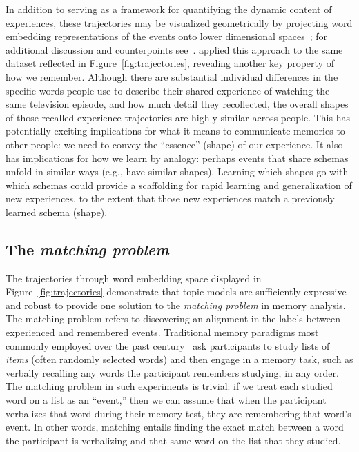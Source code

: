 \documentclass{article}
\begin{document}
In addition to serving as a framework for quantifying the dynamic content of experiences, these trajectories may be visualized geometrically by projecting word embedding representations of the events onto lower dimensional spaces~\citep[e.g., ][]{HeusEtal18a}; for additional discussion and counterpoints see~\cite{JollChan18}.  \cite{HeusEtal18c} applied this approach to the same dataset reflected in Figure~\ref{fig:trajectories}, revealing another key property of how we remember.  Although there are substantial individual differences in the specific words people use to describe their shared experience of watching the same television episode, and how much detail they recollected, the overall shapes of those recalled experience trajectories are highly similar across people.  This has potentially exciting implications for what it means to communicate memories to other people: we need to convey the ``essence'' (shape) of our experience.  It also has implications for how we learn by analogy: perhaps events that share schemas~\citep[e.g., ][]{BaldEtal18}  unfold in similar ways (e.g., have similar shapes).  Learning which shapes go with which schemas could provide a scaffolding for rapid learning and generalization of new experiences, to the extent that those new experiences match a previously learned schema (shape).

\subsection*{The \textit{matching problem}}
The trajectories through word embedding space displayed in Figure~\ref{fig:trajectories} demonstrate that topic models are sufficiently expressive and robust to provide one solution to the \textit{matching problem} in memory analysis.  The matching problem refers to discovering an alignment in the labels between experienced and remembered events.  Traditional memory paradigms most commonly employed over the past century~\citep{Kaha12} ask participants to study lists of \textit{items} (often randomly selected words) and then engage in a memory task, such as verbally recalling any words the participant remembers studying, in any order.  The matching problem in such experiments is trivial: if we treat each studied word on a list as an ``event,'' then we can assume that when the participant verbalizes that word during their memory test, they are remembering that word's event.  In other words, matching entails finding the exact match between a word the participant is verbalizing and that same word on the list that they studied.
\end{document}
